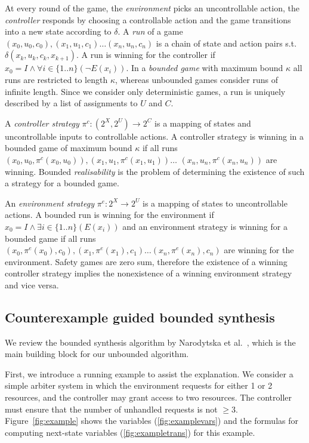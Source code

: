 \documentclass{llncs}
\begin{document}
At every round of the game, the \emph{environment} picks an uncontrollable
action, the \emph{controller} responds by choosing a controllable action and
the game transitions into a new state according to $\delta$.  A \emph{run} of a
game $(x_0, u_0, c_0), (x_1, u_1, c_1) \dots (x_n, u_n, c_n)$ is a chain of
state and action pairs s.t.\,$\delta(x_k, u_k, c_k, x_{k+1})$.  A run is
winning for the controller if $x_0 = I \land \forall i \in \{1..n\} (\lnot
E(x_i))$.  In a \emph{bounded game} with maximum bound $\kappa$ all runs are
restricted to length $\kappa$, whereas unbounded games consider runs of
infinite length.  Since we consider only deterministic games, a run is uniquely
described by a list of assignments to $U$ and $C$.

A \emph{controller strategy} $\pi^c : (2^X, 2^U) \to 2^C$ is a mapping of states and
uncontrollable inputs to controllable actions. A controller strategy is winning
in a bounded game of maximum bound $\kappa$ if all runs $(x_0, u_0, \pi^c(x_0,
u_0)), (x_1, u_1, \pi^c(x_1, u_1)) \dots$ $(x_n, u_n, \pi^c(x_n, u_n))$ are
winning.  Bounded \emph{realisability} is the problem of determining the
existence of such a strategy for a bounded game.

An \emph{environment strategy} $\pi^e : 2^X \to 2^U$ is a mapping of states to
uncontrollable actions. A bounded run is winning for the environment if $x_0 =
I \land \exists i \in \{1..n\} (E(x_i))$ and an environment strategy is winning
for a bounded game if all runs $(x_0, \pi^e(x_0), c_0), (x_1, \pi^e(x_1), c_1)
\dots (x_n, \pi^e(x_n), c_n)$ are winning for the environment.  Safety games
are zero sum, therefore the existence of a winning controller strategy implies
the nonexistence of a winning environment strategy and vice versa.

\subsection{Counterexample guided bounded synthesis}

We review the bounded synthesis algorithm by Narodytska et
al.~\cite{narodytska2014}, which is the main building block for our unbounded
algorithm.

First, we introduce a running example to assist the explanation. We consider a
simple arbiter system in which the environment requests for either 1 or 2
resources, and the controller may grant access to two resources. The controller
must ensure that the number of unhandled requests is not $\geq 3$.
Figure~\ref{fig:example} shows the variables (\ref{fig:examplevars}) and the
formulas for computing next-state variables (\ref{fig:exampletrans}) for this
example.
\end{document}
